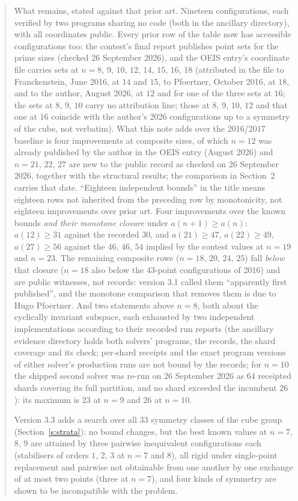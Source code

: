 \documentclass[11pt,a4paper]{article}
\begin{document}
\begin{abstract}
What remains, stated against that prior art.  Nineteen configurations, each verified by two
programs sharing no code (both in the ancillary directory), with all coordinates public.  Every prior row of the table now has
accessible configurations too: the contest's final report publishes point sets for the prime sizes
(checked 26 September 2026), and the OEIS entry's coordinate file carries sets at $n=8$, $9$, $10$, $12$,
$14$, $15$, $16$, $18$ (attributed in the file to Franckenstein, June 2016, at $14$ and $15$, to Pfoertner,
October 2016, at $18$, and to the author, August 2026, at $12$ and for one of the three sets at $16$; the sets at
$8$, $9$, $10$ carry no attribution line; those at $8$, $9$, $10$, $12$ and that one at $16$ coincide with the
author's 2026 configurations up to a symmetry of the cube, not verbatim).  What this note adds over the 2016/2017 baseline is four improvements at composite
sizes, of which $n=12$ was already published by the author in the OEIS entry (August 2026) and $n=21$, $22$, $27$
are new to the public record as checked on 26 September 2026, together with the structural results; the
comparison in Section~2 carries that date.  ``Eighteen independent bounds'' in the title means eighteen rows not inherited from
the preceding row by monotonicity, not eighteen improvements over prior art.  Four improvements over the known bounds \emph{and their monotone
closure} under $a(n+1)\ge a(n)$: $a(12)\ge31$ against the recorded $30$, and $a(21)\ge47$,
$a(22)\ge49$, $a(27)\ge56$ against the $46$, $46$, $54$ implied by the contest values at $n=19$
and $n=23$.  The remaining composite rows ($n=18$, $20$, $24$, $25$) fall \emph{below} that
closure ($n=18$ also below the $43$-point configurations of 2016) and are public witnesses, not records: version 3.1 called them ``apparently first
published'', and the monotone comparison that removes them is due to Hugo Pfoertner.  And two
statements above $n=8$, both about the cyclically invariant subspace, each exhausted by two
independent implementations according to their recorded run reports (the ancillary evidence
directory holds both solvers' programs, the records, the shard coverage and its check; per-shard
receipts and the exact program versions of either solver's production runs are not bound by the
records; for $n=10$ the shipped second solver was re-run on 26 September 2026 as $64$ receipted shards
covering its full partition, and no shard exceeded the incumbent $26$): its maximum is $23$ at $n=9$ and $26$ at $n=10$.

Version 3.3 adds a search over all 33 symmetry classes of the cube group
(Section~\ref{s:strata}): no bound changes, but the best known values at $n=7$, $8$, $9$ are
attained by three pairwise inequivalent configurations each (stabilisers of orders $1$, $2$, $3$
at $n=7$ and $8$), all rigid under single-point replacement and pairwise not obtainable from one
another by one exchange of at most two points (three at $n=7$), and four kinds of
symmetry are shown to be incompatible with the problem.


\end{abstract}
\end{document}
